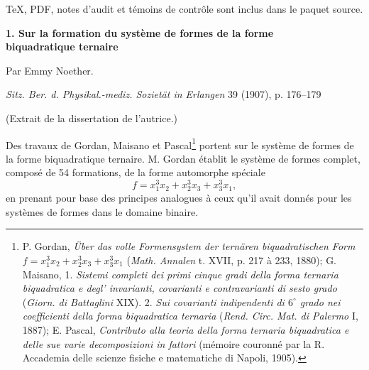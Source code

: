 \documentclass[11pt]{article}
\providecommand{\mat}[1]{\begin{pmatrix}#1\end{pmatrix}}
\begin{document}
\vfill

\begin{center}
{\small TeX, PDF, notes d'audit et témoins de contrôle sont inclus dans le paquet source.}
\end{center}
\clearpage
\providecommand{\mat}[1]{\begin{pmatrix}#1\end{pmatrix}}

\begin{center}
{\Large\bfseries 1. Sur la formation du système de formes de la forme\\ biquadratique ternaire}\par
\vspace{1.2em}
Par Emmy Noether.\par
\vspace{0.8em}
\emph{Sitz. Ber. d. Physikal.-mediz. Sozietät in Erlangen} 39 (1907), p. 176--179
\end{center}

\vspace{4em}
\begin{center}
(Extrait de la dissertation de l'autrice.)
\end{center}

Des travaux de Gordan, Maisano et Pascal\footnote{P. Gordan, \emph{Über das volle Formensystem der ternären biquadratischen Form} $f=x_1^3x_2+x_2^3x_3+x_3^3x_1$ (\emph{Math. Annalen} t. XVII, p. 217 à 233, 1880); G. Maisano, 1. \emph{Sistemi completi dei primi cinque gradi della forma ternaria biquadratica e degl' invarianti, covarianti e contravarianti di sesto grado} (\emph{Giorn. di Battaglini} XIX). 2. \emph{Sui covarianti indipendenti di $6^\circ$ grado nei coefficienti della forma biquadratica ternaria} (\emph{Rend. Circ. Mat. di Palermo} I, 1887); E. Pascal, \emph{Contributo alla teoria della forma ternaria biquadratica e delle sue varie decomposizioni in fattori} (mémoire couronné par la R. Accademia delle scienze fisiche e matematiche di Napoli, 1905).} portent sur le système de formes de la forme biquadratique ternaire. M. Gordan établit le système de formes complet, composé de 54 formations, de la forme automorphe spéciale
\[
f=x_1^3x_2+x_2^3x_3+x_3^3x_1,
\]
en prenant pour base des principes analogues à ceux qu'il avait donnés pour les systèmes de formes dans le domaine binaire.
\end{document}
